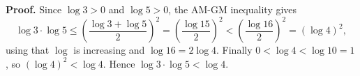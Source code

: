 \textbf{Proof.} Since $\log3>0$ and $\log5>0$, the AM-GM inequality gives
\[
\log3\cdot\log5\le\left(\dfrac{\log3+\log5}{2}\right)^2=\left(\dfrac{\log15}{2}\right)^2<\left(\dfrac{\log16}{2}\right)^2=(\log4)^2 ,
\]
using that $\log$ is increasing and $\log16=2\log4$. Finally $0<\log4<\log10=1$, so $(\log4)^2<\log4$. Hence $\log3\cdot\log5<\log4$.
